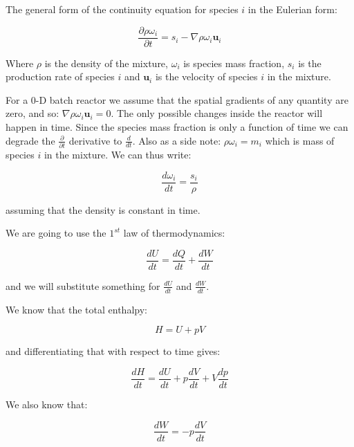 The general form of the continuity equation for species $i$ in the Eulerian form:

\begin{equation} \label{eq:species-mass-conservation}
\frac{\partial \rho \omega_i}{\partial t} = s_i - \nabla \rho \omega_i \mathbf{u}_{i}
\end{equation}

Where $\rho$ is the density of the mixture, $\omega_i$ is species mass fraction, $s_i$ is the production rate of species $i$ and $\mathbf{u}_i$ is the velocity of species $i$ in the mixture.

For a 0-D batch reactor we assume that the spatial gradients of any quantity are zero, and so: $ \nabla \rho \omega_i \mathbf{u}_{i} = 0$. The only possible changes inside the reactor will happen in time. Since the species mass fraction is only a function of time we can degrade the $\frac{\partial}{\partial t}$ derivative to $\frac{d}{dt}$. Also as a side note: $\rho \omega_i = m_i$ which is mass of species $i$ in the mixture. We can thus write:

\begin{equation} \label{eq:batch-reactor-species-mass}
\frac{d \omega_i}{dt} = \frac{s_i}{\rho}
\end{equation}

assuming that the density is constant in time.

We are going to use the $1^{st}$ law of thermodynamics:

\begin{equation}
\frac{dU}{dt} = \frac{dQ}{dt} + \frac{dW}{dt}
\end{equation}

and we will substitute something for $\frac{dU}{dt}$ and $\frac{dW}{dt}$.

We know that the total enthalpy:

\begin{equation}
H = U + p V
\end{equation}

and differentiating that with respect to time gives:

\begin{equation} \label{eq:enthalpy}
\frac{d H}{dt} = \frac{dU}{dt} + p \frac{dV}{dt} + V \frac{dp}{dt}
\end{equation}

We also know that:

\begin{equation} \label{eq:power}
\frac{dW}{dt} = -p \frac{dV}{dt}
\end{equation}


